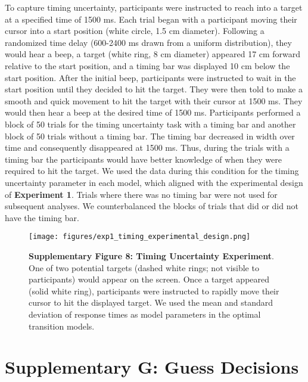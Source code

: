 \documentclass[12pt]{article}
\newcommand\boldblue[1]{\textcolor{mydarkblue}{\textbf{#1}}}
\begin{document}
\noindent To capture timing uncertainty, participants were instructed to reach into a target at a specified time of 1500 ms. Each trial began with a participant moving their cursor into a start position (white circle, 1.5 cm diameter). Following a randomized time delay (600-2400 ms drawn from a uniform distribution), they would hear a beep, a target (white ring, 8 cm diameter) appeared 17 cm forward relative to the start position, and a timing bar was displayed 10 cm below the start position. After the initial beep, participants were instructed to wait in the start position until they decided to hit the target. They were then told to make a smooth and quick movement to hit the target with their cursor at 1500 ms. They would then hear a beep at the desired time of 1500 ms. Participants performed a block of 50 trials for the timing uncertainty task with a timing bar and another block of 50 trials without a timing bar. The timing bar decreased in width over time and consequently disappeared at 1500 ms. Thus, during the trials with a timing bar the participants would have better knowledge of when they were required to hit the target. We used the data during this condition for the timing uncertainty parameter in each model, which aligned with the experimental design of \boldblue{Experiment 1}. Trials where there was no timing bar were not used for subsequent analyses. We counterbalanced the blocks of trials that did or did not have the timing bar.
\begin{figure}[H]
    \centering
    \texttt{[image: figures/exp1\_timing\_experimental\_design.png]}

    \caption*{\boldblue{Supplementary Figure 8: Timing Uncertainty Experiment}. One of two potential targets (dashed white rings; not visible to participants) would appear on the screen. Once a target appeared (solid white ring), participants were instructed to rapidly move their cursor to hit the displayed target. We used the mean and standard deviation of response times as model parameters in the optimal transition models.}
\end{figure}

\newpage
\section{Supplementary G: Guess Decisions}
\end{document}
